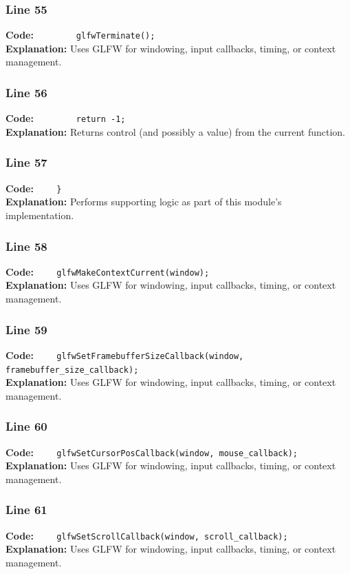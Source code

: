 \documentclass[11pt,a4paper]{article}
\begin{document}
\subsubsection*{Line 55}
\textbf{Code:} \verb|        glfwTerminate();|\\
\textbf{Explanation:} Uses GLFW for windowing, input callbacks, timing, or context management.

\subsubsection*{Line 56}
\textbf{Code:} \verb|        return -1;|\\
\textbf{Explanation:} Returns control (and possibly a value) from the current function.

\subsubsection*{Line 57}
\textbf{Code:} \verb|    }|\\
\textbf{Explanation:} Performs supporting logic as part of this module's implementation.

\subsubsection*{Line 58}
\textbf{Code:} \verb|    glfwMakeContextCurrent(window);|\\
\textbf{Explanation:} Uses GLFW for windowing, input callbacks, timing, or context management.

\subsubsection*{Line 59}
\textbf{Code:} \verb|    glfwSetFramebufferSizeCallback(window, framebuffer_size_callback);|\\
\textbf{Explanation:} Uses GLFW for windowing, input callbacks, timing, or context management.

\subsubsection*{Line 60}
\textbf{Code:} \verb|    glfwSetCursorPosCallback(window, mouse_callback);|\\
\textbf{Explanation:} Uses GLFW for windowing, input callbacks, timing, or context management.

\subsubsection*{Line 61}
\textbf{Code:} \verb|    glfwSetScrollCallback(window, scroll_callback);|\\
\textbf{Explanation:} Uses GLFW for windowing, input callbacks, timing, or context management.
\end{document}
